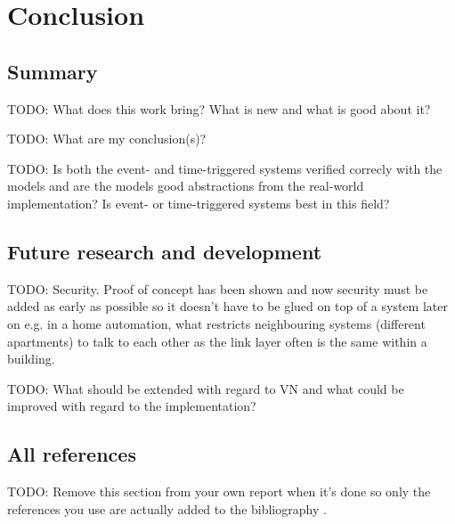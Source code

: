 \chapter{Conclusion}\label{ch:conclusion}
\section{Summary}
TODO: What does this work bring? What is new and what is good about it?

TODO: What are my conclusion(s)?

TODO: Is both the event- and time-triggered systems verified correcly with the
models and are the models good abstractions from the real-world implementation?
Is event- or time-triggered systems best in this field?

\section{Future research and development}
TODO: Security. Proof of concept has been shown and now security must be added
as early as possible so it doesn't have to be glued on top of a system later on
e.g. in a home automation, what restricts neighbouring systems (different
apartments) to talk to each other as the link layer often is the same within a
building.

TODO: What should be extended with regard to VN and what could be improved with
regard to the implementation?

\section{All references}
TODO: Remove this section from your own report when it's done so only the
references you use are actually added to the bibliography \cite{*}.
